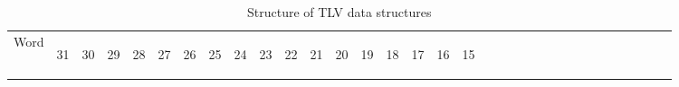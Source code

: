 \documentclass[11pt]{article}
\begin{document}
\begin{table}[h!]
    \centering
    \caption{Structure of TLV data structures}
    \label{tab:TLVDef}
    \begin{tabular}{|p{1cm}|p{0.04cm}|p{0.04cm}|m{0.04cm}|m{0.04cm}|m{0.04cm}|m{0.04cm}|m{0.04cm}|m{0.04cm}|m{0.04cm}|
        m{0.04cm}|m{0.04cm}|m{0.04cm}|m{0.04cm}|m{0.04cm}|m{0.04cm}|m{0.04cm}|m{0.04cm}|m{0.04cm}|m{0.04cm}|m{0.04cm}|
        m{0.04cm}|m{0.04cm}|m{0.04cm}|m{0.04cm}|m{0.04cm}|m{0.04cm}|m{0.04cm}|m{0.04cm}|m{0.04cm}|m{0.04cm}|m{0.04cm}|m{0.04cm}|}
        \hline
        Word & 
        \begin{sideways}31\end{sideways} &
        \begin{sideways}30\end{sideways} & 
        \begin{sideways}29\end{sideways} &
        \begin{sideways}28\end{sideways} &
        \begin{sideways}27\end{sideways} &
        \begin{sideways}26\end{sideways} &
        \begin{sideways}25\end{sideways} &
        \begin{sideways}24\end{sideways} &
        \begin{sideways}23\end{sideways} &
        \begin{sideways}22\end{sideways} &
        \begin{sideways}21\end{sideways} &
        \begin{sideways}20\end{sideways} &
        \begin{sideways}19\end{sideways} &
        \begin{sideways}18\end{sideways} &
        \begin{sideways}17\end{sideways} &
        \begin{sideways}16\end{sideways} &
        \begin{sideways}15\end{sideways} &

\end{tabular}
\end{table}
\end{document}
